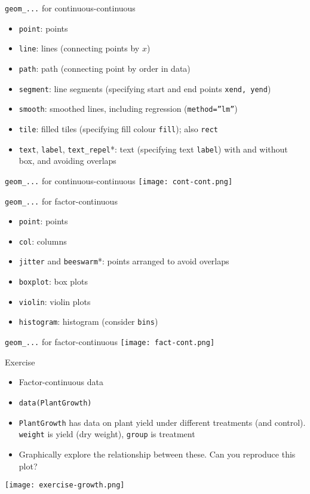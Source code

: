 \documentclass[10pt]{beamer}
\begin{document}
\begin{frame}{\texttt{geom\_...} for continuous-continuous}
    \begin{itemize}
    \item \texttt{point}: points
    \item \texttt{line}: lines (connecting points by $x$)
       \item \texttt{path}: path (connecting point by order in data)
        \item \texttt{segment}: line segments (specifying start and end points \texttt{xend, yend})
       \item \texttt{smooth}: smoothed lines, including regression (\texttt{method=''lm''})
             \item \texttt{tile}: filled tiles (specifying fill colour \texttt{fill}); also \texttt{rect}
               \item \texttt{text}, \texttt{label}, \texttt{text\_repel}*: text (specifying text \texttt{label}) with and without box, and avoiding overlaps
               \end{itemize}
\end{frame}


\begin{frame}{\texttt{geom\_...} for continuous-continuous}
  \texttt{[image: cont-cont.png]}
\end{frame}

\begin{frame}{\texttt{geom\_...} for factor-continuous}
    \begin{itemize}
    \item \texttt{point}: points
      \item \texttt{col}: columns
    \item \texttt{jitter} and \texttt{beeswarm}*: points arranged to avoid overlaps
       \item \texttt{boxplot}: box plots
             \item \texttt{violin}: violin plots
    \item \texttt{histogram}: histogram (consider \texttt{bins})
              \end{itemize}
\end{frame}

\begin{frame}{\texttt{geom\_...} for factor-continuous}
  \texttt{[image: fact-cont.png]}
\end{frame}

\begin{frame}{Exercise}
  \begin{itemize}
  \item Factor-continuous data
    \item[] \texttt{data(PlantGrowth)}
    \item \texttt{PlantGrowth} has data on plant yield under different treatments (and control). \texttt{weight} is yield (dry weight), \texttt{group} is treatment
     \item Graphically explore the relationship between these. Can you reproduce this plot?
  \end{itemize}
  \texttt{[image: exercise-growth.png]}
\end{frame}
\end{document}
